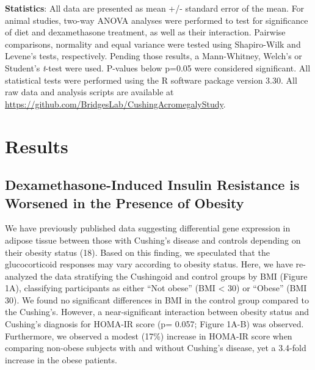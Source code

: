 \documentclass[11pt]{article} %
\begin{document}
\textbf{Statistics}: All data are presented as mean +/- standard error
of the mean. For animal studies, two-way ANOVA analyses were performed
to test for significance of diet and dexamethasone treatment, as well as
their interaction. Pairwise comparisons, normality and equal variance
were tested using Shapiro-Wilk and Levene's tests, respectively. Pending
those results, a Mann-Whitney, Welch's or Student's \emph{t}-test were
used. P-values below p=0.05 were considered significant. All statistical
tests were performed using the R software package version 3.30. All raw
data and analysis scripts are available at
\url{https://github.com/BridgesLab/CushingAcromegalyStudy}.

\section*{Results}

\subsection*{Dexamethasone-Induced Insulin Resistance is Worsened in the
Presence of Obesity
}\label{dexamethasone-induced-insulin-resistance-is-worsened-in-the-presence-of-obesity}

We have previously published data suggesting differential gene
expression in adipose tissue between those with Cushing's disease and
controls depending on their obesity status (18). Based on this finding,
we speculated that the glucocorticoid responses may vary according to
obesity status. Here, we have re-analyzed the data stratifying the
Cushingoid and control groups by BMI (Figure 1A), classifying
participants as either ``Not obese'' (BMI \textless{} 30) or ``Obese''
(BMI  30). We found no significant differences in BMI in the control
group compared to the Cushing's. However, a near-significant interaction
between obesity status and Cushing's diagnosis for HOMA-IR score (p=
0.057; Figure 1A-B) was observed. Furthermore, we observed a modest
(17\%) increase in HOMA-IR score when comparing non-obese subjects with
and without Cushing's disease, yet a 3.4-fold increase in the obese
patients.
\end{document}
